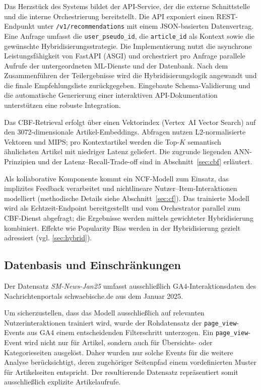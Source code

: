 \label{sec:api_design}
Das Herzstück des Systems bildet der API-Service, der die externe Schnittstelle und die interne Orchestrierung 
bereitstellt. Die API exponiert einen REST-Endpunkt unter \texttt{/v1/recommendations} mit einem JSON-basierten 
Datenvertrag. Eine Anfrage umfasst die \texttt{user\_pseudo\_id}, die \texttt{article\_id} als Kontext sowie die 
gewünschte Hybridisierungsstrategie. Die Implementierung nutzt die asynchrone Leistungsfähigkeit von FastAPI 
(\ac{ASGI}) und orchestriert pro Anfrage parallele Aufrufe der untergeordneten ML-Dienste und der Datenbank. 
Nach dem Zusammenführen der Teilergebnisse wird die Hybridisierungslogik angewandt und die finale Empfehlungsliste 
zurückgegeben. Eingebaute Schema-Validierung und die automatische Generierung einer interaktiven API-Dokumentation 
unterstützen eine robuste Integration.

\label{sec:cbf_service}
Das \ac{CBF}-Retrieval erfolgt über einen Vektorindex (Vertex~AI Vector Search) auf den 
3072-dimensionale Artikel-Embeddings. Abfragen nutzen L2-normalisierte Vektoren und \ac{MIPS}; 
pro Kontextartikel werden die Top-$K$ semantisch ähnlichsten Artikel mit niedriger Latenz 
geliefert. Die zugrunde liegenden \ac{ANN}-Prinzipien und der Latenz–Recall-Trade-off 
sind in Abschnitt~\ref{sec:cbf} erläutert.

\label{sec:ncf_service}
Als kollaborative Komponente kommt ein \ac{NCF}-Modell zum Einsatz, 
das implizites Feedback verarbeitet und nichtlineare 
Nutzer–Item-Interaktionen modelliert (methodische Details siehe Abschnitt~\ref{sec:cf}). 
Das trainierte Modell wird als Echtzeit-Endpoint bereitgestellt und vom 
Orchestrator parallel zum \ac{CBF}-Dienst abgefragt; die Ergebnisse werden mittels 
gewichteter Hybridisierung kombiniert. Effekte wie Popularity Bias werden in der 
Hybridisierung gezielt adressiert (vgl. \ref{sec:hybrid}).

\subsection{Datenbasis und Einschränkungen}
\label{sec:data}
Der Datensatz \textit{SM-News-Jan25} umfasst ausschließlich \ac{GA4}-Interaktionsdaten des Nachrichtenportals 
schwaebische.de aus dem Januar 2025.


Um sicherzustellen, dass das Modell ausschließlich auf relevanten Nutzerinteraktionen trainiert wird, 
wurde der Rohdatensatz der \texttt{page\_view}-Events aus \ac{GA4} einem entscheidenden Filterschritt unterzogen. 
Ein \texttt{page\_view}-Event wird nicht nur für Artikel, sondern auch für Übersichts- oder Kategorieseiten ausgelöst. 
Daher wurden nur solche Events für die weitere Analyse berücksichtigt, deren zugehöriger Seitenpfad einem vordefinierten 
Muster für Artikelseiten entspricht. Der resultierende Datensatz repräsentiert somit ausschließlich explizite 
Artikelaufrufe.


